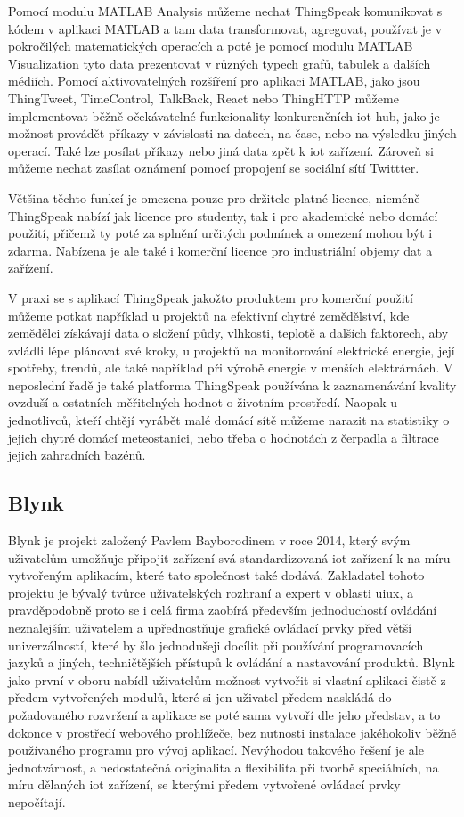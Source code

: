 Pomocí modulu MATLAB Analysis můžeme nechat ThingSpeak komunikovat s kódem v aplikaci MATLAB a tam data transformovat, agregovat, používat je v pokročilých matematických operacích a poté je pomocí modulu MATLAB Visualization tyto data prezentovat v různých typech grafů, tabulek a dalších médiích. Pomocí aktivovatelných rozšíření pro aplikaci MATLAB, jako jsou ThingTweet, TimeControl, TalkBack, React nebo ThingHTTP můžeme implementovat běžně očekávatelné funkcionality konkurenčních \acrshort{iot} hub, jako je možnost provádět příkazy v závislosti na datech, na čase, nebo na výsledku jiných operací. Také lze posílat příkazy nebo jiná data zpět k \acrshort{iot} zařízení. Zároveň si můžeme nechat zasílat oznámení pomocí propojení se sociální sítí Twittter.

Většina těchto funkcí je omezena pouze pro držitele platné licence, nicméně ThingSpeak nabízí jak licence pro studenty, tak i pro akademické nebo domácí použití, přičemž ty poté za splnění určitých podmínek a omezení mohou být i zdarma. Nabízena je ale také i komerční licence pro industriální objemy dat a zařízení.

V praxi se s aplikací ThingSpeak jakožto produktem pro komerční použití můžeme potkat například u projektů na efektivní chytré zemědělství, kde zemědělci získávají data o složení půdy, vlhkosti, teplotě a dalších faktorech, aby zvládli lépe plánovat své kroky, u projektů na monitorování elektrické energie, její spotřeby, trendů, ale také například při výrobě energie v menších elektrárnách. V neposlední řadě je také platforma ThingSpeak používána k zaznamenávání kvality ovzduší a ostatních měřitelných hodnot o životním prostředí. Naopak u jednotlivců, kteří chtějí vyrábět malé domácí sítě můžeme narazit na statistiky o jejich chytré domácí meteostanici, nebo třeba o hodnotách z čerpadla a filtrace jejich zahradních bazénů.

\subsection{Blynk}

Blynk je projekt založený Pavlem Bayborodinem v roce 2014, který svým uživatelům umožňuje připojit zařízení svá standardizovaná \acrshort{iot} zařízení k na míru vytvořeným aplikacím, které tato společnost také dodává. Zakladatel tohoto projektu je bývalý tvůrce uživatelských rozhraní a expert v oblasti \acrshort{uiux}, a pravděpodobně proto se i celá firma zaobírá především jednoduchostí ovládání neznalejším uživatelem a upřednostňuje grafické ovládací prvky před větší univerzálností, které by šlo jednodušeji docílit při používání programovacích jazyků a jiných, techničtějších přístupů k ovládání a nastavování produktů. Blynk jako první v oboru nabídl uživatelům možnost vytvořit si vlastní aplikaci čistě z předem vytvořených modulů, které si jen uživatel předem naskládá do požadovaného rozvržení a aplikace se poté sama vytvoří dle jeho představ, a to dokonce v prostředí webového prohlížeče, bez nutnosti instalace jakéhokoliv běžně používaného programu pro vývoj aplikací. Nevýhodou takového řešení je ale jednotvárnost, a nedostatečná originalita a flexibilita při tvorbě speciálních, na míru dělaných \acrshort{iot} zařízení, se kterými předem vytvořené ovládací prvky nepočítají.

